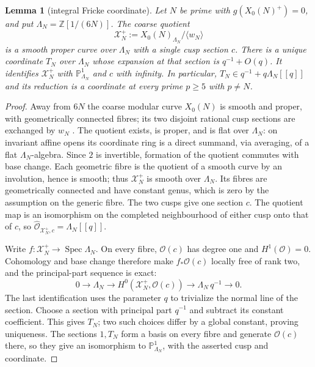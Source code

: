 \documentclass[11pt,a4paper]{article}
\numberwithin{equation}{section}
\newtheorem{lemma}[theorem]{Lemma}
\theoremstyle{definition}
\theoremstyle{remark}
\newcommand{\Z}{\mathbb Z}
\begin{document}
\begin{lemma}[integral Fricke coordinate]\label{lem:coordinate}
Let $N$ be prime with $g(X_0(N)^+)=0$, and put
$\Lambda_N=\Z[1/(6N)]$. The coarse quotient
\[
\mathcal X_N^+:=X_0(N)_{\Lambda_N}/\langle w_N\rangle
\]
is a smooth proper curve over $\Lambda_N$ with a single cusp section $c$.
There is a unique coordinate $T_N$ over $\Lambda_N$ whose expansion at
that section is $q^{-1}+O(q)$. It identifies $\mathcal X_N^+$ with
$\mathbb P^1_{\Lambda_N}$ and $c$ with infinity. In particular,
$T_N\in q^{-1}+q\Lambda_N[[q]]$ and its reduction is a coordinate
at every prime $p\ge5$ with $p\ne N$.
\end{lemma}
\begin{proof}
Away from $6N$ the coarse modular curve $X_0(N)$ is smooth and proper,
with geometrically connected fibres; its two disjoint rational cusp
sections are exchanged by $w_N$ \citep{DR73,KM85}.
The quotient exists, is proper, and is flat over $\Lambda_N$:
on invariant affine opens its coordinate ring is a direct summand,
via averaging, of a flat $\Lambda_N$-algebra. Since $2$ is invertible,
formation of the quotient commutes with base change. Each geometric
fibre is the quotient of a smooth curve by an involution, hence is
smooth; thus $\mathcal X_N^+$ is smooth over $\Lambda_N$.
Its fibres are geometrically connected and have constant genus,
which is zero by the assumption on the generic fibre.
The two cusps give one section $c$. The quotient map is an isomorphism
on the completed neighbourhood of either cusp onto that of $c$, so
$\widehat{\mathcal O}_{\mathcal X_N^+,c}=\Lambda_N[[q]]$.

Write $f:\mathcal X_N^+\to\operatorname{Spec}\Lambda_N$.
On every fibre, $\mathcal O(c)$ has degree one and $H^1(\mathcal O)=0$.
Cohomology and base change therefore make $f_*\mathcal O(c)$ locally
free of rank two, and the principal-part sequence is exact:
\[
0\longrightarrow\Lambda_N\longrightarrow
H^0(\mathcal X_N^+,\mathcal O(c))
\longrightarrow\Lambda_N\,q^{-1}\longrightarrow0.
\]
The last identification uses the parameter $q$ to trivialize the
normal line of the section. Choose a section with principal part
$q^{-1}$ and subtract its constant coefficient. This gives $T_N$;
two such choices differ by a global constant, proving uniqueness.
The sections $1,T_N$ form a basis on every fibre and generate
$\mathcal O(c)$ there, so they give an isomorphism to
$\mathbb P^1_{\Lambda_N}$, with the asserted cusp and coordinate.
\end{proof}
\end{document}
